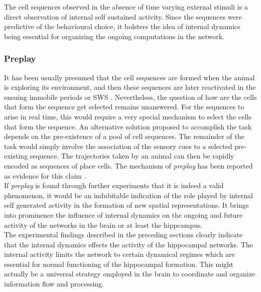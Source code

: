 The cell sequences observed in the absence of time varying external stimuli is a direct observation of internal self sustained activity. Since the sequences were predictive of the behavioural choice, it bolsters the idea of internal dynamics being essential for organizing the ongoing computations in the network.

\subsubsection{Preplay}
It has been usually presumed that the cell sequences are formed when the animal is exploring its environment, and then these sequences are later reactivated in the ensuing immobile periods or SWS \cite{Foster2006, Davidson2009}. Nevertheless, the question of how are the cells that form the sequence get selected remains unanswered. For the sequences to arise in real time, this would require a very special mechanism to select the cells that form the sequence. An alternative solution proposed to accomplish the task depends on the pre-existence of a pool of cell sequences. The remainder of the task would simply involve the association of the sensory cues to a selected pre-existing sequence. The trajectories taken by an animal can then be rapidly encoded as sequences of place cells. The mechanism of \emph{preplay} has been reported as evidence for this claim  \cite{Dragoi2011, Dragoi2013a}.\\
If \emph{preplay} is found through further experiments that it is indeed a valid phenomenon, it would be an indubitable indication of the role played by internal self generated activity in the formation of new spatial representations. It brings into prominence the influence of internal dynamics on the ongoing and future activity of the networks in the brain or at least the hippcampus. \\


The experimental findings described in the preceding sections clearly indicate that the internal dynamics effects the activity of the hippocampal networks. The internal activity limits the network to certain dynamical regimes which are essential for normal functioning of the hippocampal formation. This might actually be a universal strategy employed in the brain to coordinate and organize information flow and processing.\\

